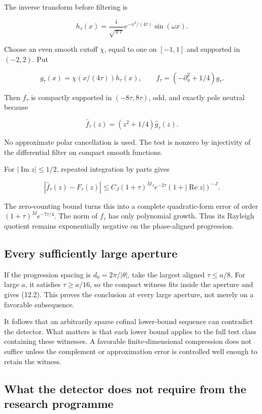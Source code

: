 \documentclass[
  10pt,
  a4paper,
  10pt,
  oneside,
  openany]{book}
\begin{document}
The inverse transform before filtering is

\[
h_\tau(x)=\frac{i}{\sqrt{\pi\tau}}e^{-x^2/(4\tau)}\sin(\omega x).
\tag{12.6}\label{eq:12.6}
\]

Choose an even smooth cutoff \(\chi\), equal to one on \([-1,1]\) and
supported in \((-2,2)\). Put

\[
g_\tau(x)=\chi(x/(4\tau))h_\tau(x),
\qquad
f_\tau=(-\partial_x^2+1/4)g_\tau.
\tag{12.7}\label{eq:12.7}
\]

Then \(f_\tau\) is compactly supported in \((-8\tau,8\tau)\), odd, and
exactly pole neutral because

\[
\widehat f_\tau(z)=(z^2+1/4)\widehat g_\tau(z).
\tag{12.8}\label{eq:12.8}
\]

No approximate polar cancellation is used. The test is nonzero by
injectivity of the differential filter on compact smooth functions.

For \(|\operatorname{Im}z|\le1/2\), repeated integration by parts gives

\[
|\widehat f_\tau(z)-F_\tau(z)|
\le C_J(1+\tau)^{M_J}e^{-2\tau}
(1+|\operatorname{Re}z|)^{-J}.
\tag{12.9}\label{eq:12.9}
\]

The zero-counting bound turns this into a complete quadratic-form error
of order \((1+\tau)^Me^{-7\tau/4}\). The norm of \(f_\tau\) has only
polynomial growth. Thus its Rayleigh quotient remains exponentially
negative on the phase-aligned progression.

\subsection{Every sufficiently large
aperture}\label{every-sufficiently-large-aperture}

If the progression spacing is \(d_0=2\pi/|\theta|\), take the largest
aligned \(\tau\le a/8\). For large \(a\), it satisfies \(\tau\ge a/16\),
so the compact witness fits inside the aperture and gives (12.2). This
proves the conclusion at every large aperture, not merely on a favorable
subsequence.

It follows that an arbitrarily sparse cofinal lower-bound sequence can
contradict the detector. What matters is that each lower bound applies
to the full test class containing these witnesses. A favorable
finite-dimensional compression does not suffice unless the complement or
approximation error is controlled well enough to retain the witness.

\subsection{What the detector does not require from the research
programme}\label{what-the-detector-does-not-require-from-the-research-programme}
\end{document}

